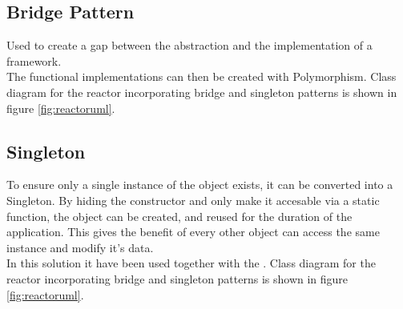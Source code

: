 \documentclass[Main]{subfiles}
\begin{document}
\subsection{Bridge Pattern}
Used to create a gap between the abstraction and the implementation of a framework.\\
The functional implementations can then be created with Polymorphism. Class diagram for the reactor incorporating bridge and singleton patterns is shown in figure \ref{fig:reactoruml}.

\subsection{Singleton}
To ensure only a single instance of the object exists, it can be converted into a Singleton.
By hiding the constructor and only make it accesable via a static function, the object can be created, and reused for the duration of the application. This gives the benefit of every other object can access the same instance and modify it's data.\\
In this solution it have been used together with the . Class diagram for the reactor incorporating bridge and singleton patterns is shown in figure \ref{fig:reactoruml}.
\end{document}

